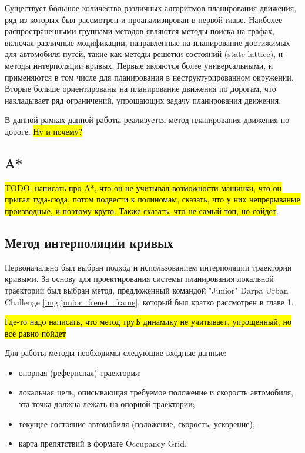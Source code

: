 Существует большое количество различных алгоритмов планирования движения, ряд из которых был рассмотрен и проанализирован
в первой главе. Наиболее распространенными группами методов являются методы поиска на графах, включая различные
модификации, направленные на планирование достижимых для автомобиля путей, такие как методы решетки состояний
(state lattice), и методы интерполяции кривых. Первые являются более универсальными, и применяются в том числе для
планирования в неструктурированном окружении. Вторые больше ориентированы на планирование движения по дорогам, что
накладывает ряд ограничений, упрощающих задачу планирования движения.

В данной рамках данной работы реализуется метод планирования движения по дороге. \hl{Ну и почему?}

\subsection{A*}

\hl{TODO: написать про A*, что он не учитывал возможности машинки, что он прыгал туда-сюда, потом подвести к
полиномам, сказать, что у них непрерываные производные, и поэтому круто. Также сказать, что не самый топ, но сойдет}.

\subsection{Метод интерполяции кривых}
Первоначально был выбран подход и использованием интерполяции траектории кривыми. За основу для
проектирования системы планирования локальной траектории был выбран метод, предложенный командой "Junior" Darpa
Urban Challenge \ref{img:junior_frenet_frame}, который был кратко рассмотрен в главе 1.

\hl{Где-то надо написать, что метод труЪ динамику не учитывает, упрощенный, но все равно пойдет}



Для работы методы необходимы следующие входные данные:
\begin{itemize}
      \item опорная (рефернсная) траектория;
      \item локальная цель, описывающая требуемое положение и скорость автомобиля, эта точка должна
            лежать на опорной траектории;
      \item текущее состояние автомобиля (положение, скорость, ускорение);
      \item карта препятствий в формате Occupancy Grid.
\end{itemize}

